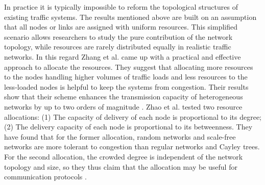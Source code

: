\documentclass[onecolumn,preprintnumbers,amsmath,amssymb]{revtex4}
\begin{document}
In practice it is typically impossible to reform the topological structures of  existing traffic systems.
The results mentioned above are built on an assumption that all nodes or links are assigned with uniform resources. 
This simplified scenario allows researchers to study the pure contribution of the network topology, while resources are rarely distributed equally in realistic traffic networks.
In this regard Zhang et al. came up with a practical and effective approach to allocate the resources. 
They suggest that allocating more resources to the nodes handling higher volumes of traffic loads and less resources to the less-loaded nodes is helpful to keep the systems from congestion.
Their results show that their scheme enhances the transmission capacity of heterogeneous networks  by up to two orders of magnitude \cite{GQZ}.
Zhao et al. tested two resource allocations: 
(1) The capacity of delivery of each node is proportional to its degree; 
(2) The delivery capacity of each node is proportional to its betweenness. 
They have found that for the former allocation, random networks and scale-free networks are more tolerant to congestion than regular networks and Cayley trees. 
For the second allocation, the crowded degree is independent of the network topology and size, so they thus claim that the allocation may be useful for communication protocols \cite{LZY}.
\end{document}
